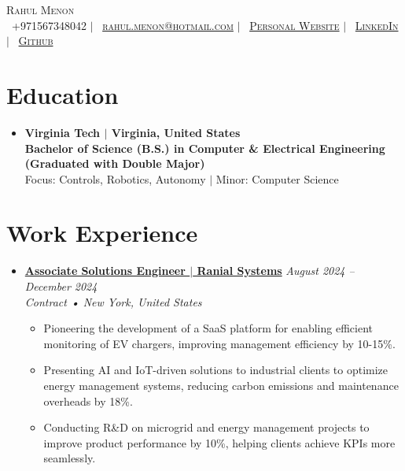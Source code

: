 \documentclass[letterpaper,11pt]{article}
\begin{document}
\pagestyle{empty} %




\begin{center}
    \Huge \scshape Rahul Menon \\
    \small
    \faPhone\ +971567348042 $|$ 
    \faEnvelope\ \href{mailto:rahulmenon@vt.edu}{rahul.menon@hotmail.com} $|$ 
    \faGlobe\ \href{https://rmenon.netlify.app/}{Personal Website} $|$ 
    \faLinkedinSquare\ \href{https://www.linkedin.com/in/rahul-ajk-m}{LinkedIn} $|$ 
    \faGithub\ \href{https://github.com/rm1738}{Github}
\end{center}



\section{Education}
\begin{itemize}[leftmargin=0mm, label={}, itemsep=0pt]
  \item \textbf{Virginia Tech $|$ \textnormal{Virginia, United States}} \hfill {\textbf{}} \\
  \textbf{Bachelor of Science  (B.S.) in Computer \& Electrical Engineering (Graduated with Double Major)} \\
Focus: Controls, Robotics, Autonomy $|$ Minor: Computer Science
\end{itemize}


\section{Work Experience}
\begin{itemize}[leftmargin=0mm, label={}, itemsep=1pt]  %

  \item \textbf{\href{https://www.ranial.com}{Associate Solutions Engineer $|$ Ranial Systems}} \hfill \textit{\small August 2024 -- December 2024} \\
  \small \textit{Contract • New York, United States} \vspace{-0.1\baselineskip}  %
  \begin{itemize}[leftmargin=5mm, itemsep=0pt, topsep=0pt]  %
    \item \small Pioneering the development of a SaaS platform for enabling efficient monitoring of EV chargers, improving management efficiency by 10-15\%.
    \item \small Presenting AI and IoT-driven solutions to industrial clients to optimize energy management systems, reducing carbon emissions and maintenance overheads by 18\%.
    \item \small Conducting R\&D on microgrid and energy management projects to improve product performance by 10\%, helping clients achieve KPIs more seamlessly.
  \end{itemize}
\end{itemize}
\end{document}
